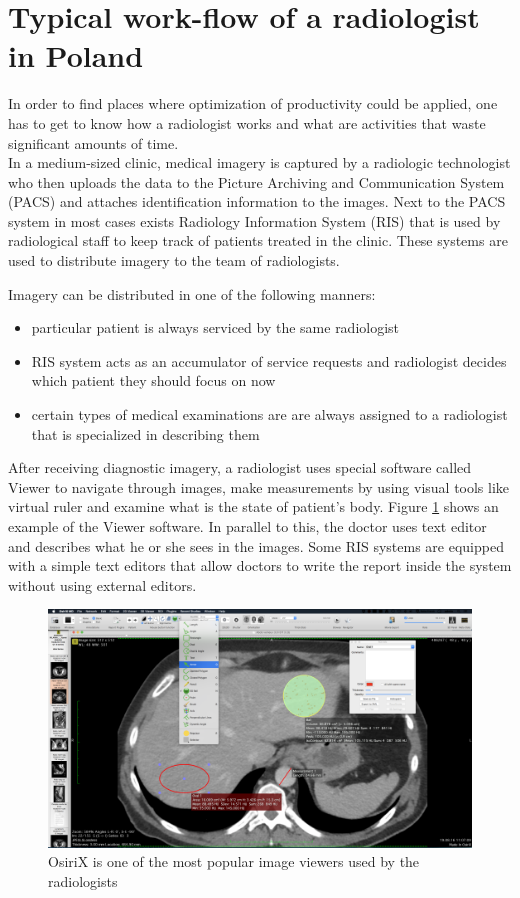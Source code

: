 \documentclass[12pt, twoside, openany]{report}
\theoremstyle{definition}
\begin{document}
\section{Typical work-flow of a radiologist in Poland}
In order to find places where optimization of productivity could be applied, one has to get to know how a radiologist works and what are activities that waste significant amounts of time. \\
In a medium-sized clinic, medical imagery is captured by a radiologic technologist who then uploads the data to the Picture Archiving and Communication System (PACS) and attaches identification information to the images. Next to the PACS system in most cases exists Radiology Information System (RIS) that is used by radiological staff to keep track of patients treated in the clinic. These systems are used to distribute imagery to the team of radiologists.

Imagery can be distributed in one of the following manners:
\begin{itemize}
    \item particular patient is always serviced by the same radiologist
    \item RIS system acts as an accumulator of service requests and radiologist decides which patient they should focus on now
    \item certain types of medical examinations are are always assigned to a radiologist that is specialized in describing them
\end{itemize}

After receiving diagnostic imagery, a radiologist uses special software called Viewer\cite{viewer} to navigate through images, make measurements by using visual tools like virtual ruler and examine what is the state of patient's body. Figure \ref{fig:osirix} shows an example of the Viewer software. In parallel to this, the doctor uses text editor and describes what he or she sees in the images. Some RIS systems are equipped with a simple text editors that allow doctors to write the report inside the system without using external editors. 

\begin{figure}
    \centering
    \includegraphics[width=0.9\linewidth]{osirix}
    \caption{OsiriX is one of the most popular image viewers used by the radiologists}
    \label{fig:osirix}
\end{figure}
\end{document}

